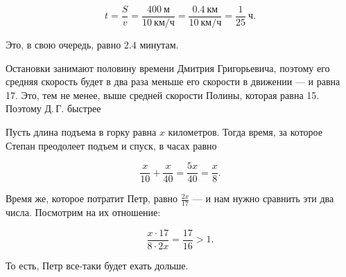 ﻿
\begin{itemize}

\itA $$t = \frac{S}{v} = \frac{\SI{400}{\text{м}}}{\SI{10}{\text{км/ч}}}
	= \frac{\SI{0.4}{\text{км}}}{\SI{10}{\text{км/ч}}}
	= \frac{1}{25}\ \text{ч}.$$

Это, в свою очередь, равно $2.4$ минутам.

\itB Остановки занимают половину времени Дмитрия Григорьевича, поэтому его средняя скорость будет в два раза меньше его скорости в движении — и равна \SI{17}{}. Это, тем не менее, выше средней скорости Полины, которая равна \SI{15}{}. Поэтому Д.\,Г. быстрее

\itC Пусть длина подъема в горку равна $x$ километров. Тогда время, за которое Степан преодолеет подъем и спуск, в часах равно

$$\frac{x}{10} + \frac{x}{40} = \frac{5x}{40} = \frac{x}{8}.$$

Время же, которое потратит Петр, равно $\frac{2x}{17}$ — и нам нужно сравнить эти два числа. Посмотрим на их отношение:

$$\frac{x \cdot 17}{8 \cdot 2x} = \frac{17}{16} > 1.$$

То есть, Петр все-таки будет ехать дольше.

\end{itemize}